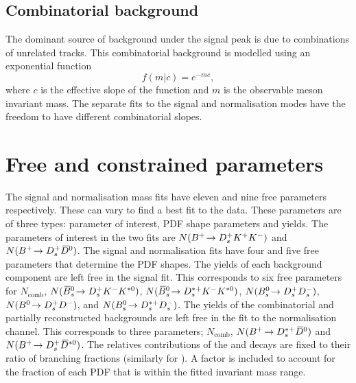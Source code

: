 \subsection{Combinatorial  background}
\label{sec:B2DsKK_combcomps}

The dominant source of background under the signal peak is due to combinations of unrelated tracks. This combinatorial background is modelled using an exponential function 
\begin{equation}
f(m|c) = e^{-mc},
\end{equation}
where $c$ is the effective slope of the function and $m$ is the observable \Bp meson invariant mass. The separate fits to the signal and normalisation modes have the freedom to have different combinatorial slopes.




\section{Free and constrained parameters}


The signal  and normalisation mass fits have eleven and nine free parameters respectively. These can vary to find a best fit to the data. These parameters are of three types: parameter of interest, PDF shape parameters and yields.
The parameters of interest in the two fits are $N({{{B}^+}}\!\rightarrow {\ensuremath{{D}^+_{s}}}{\ensuremath{{K}^+}}{\ensuremath{{K}^-}})$ and $N({{{B}^+}}\!\rightarrow {\ensuremath{{D}^+_{s}}}{\ensuremath{{\kern 0.2em\overline{\kern -0.2em D}{}}{}^0}})$.
The signal and normalisation fits have four and five free parameters that determine the PDF shapes. 
The yields of each background component are left free in the signal fit. This corresponds to six free parameters for $N_{\text{comb}}$, $N({{\kern 0.18em\overline{\kern -0.18em B}{}}{}^0_{s}}\!\rightarrow {\ensuremath{{D}^+_{s}}}{\ensuremath{{K}^-}}{\ensuremath{{K}^{*0}}})$, $N({{\kern 0.18em\overline{\kern -0.18em B}{}}{}^0_{s}}\!\rightarrow {\ensuremath{{D}^{*+}_{s}}}{\ensuremath{{K}^-}}{\ensuremath{{K}^{*0}}})$, $N({{B}^0_{s}}\!\rightarrow {\ensuremath{{D}^+_{s}}}{\ensuremath{{D}^-_{s}}})$, $N({{B}^0}\!\rightarrow {\ensuremath{{D}^+_{s}}}{\ensuremath{{D}^-}})$, and $N({{B}^0_{s}}\!\rightarrow {\ensuremath{{D}^{*+}_{s}}}{\ensuremath{{D}^-_{s}}})$. The yields of the combinatorial and partially reconstructed backgrounds are left free in the fit to the normalisation channel. This corresponds to three parameters; $N_{\text{comb}}$, $N({{{B}^+}}\!\rightarrow {\ensuremath{{D}^{*+}_{s}}}{\ensuremath{{\kern 0.2em\overline{\kern -0.2em D}{}}{}^0}})$ and $N({{{B}^+}}\!\rightarrow {\ensuremath{{D}^+_{s}}}{\ensuremath{{\kern 0.2em\overline{\kern -0.2em D}{}}{}^{*0}}})$. The relatives contributions of the \decay{\Dssp}{\Dsp\piz} and \decay{\Dssp}{\Dsp\Pgamma} decays are fixed to their ratio of branching fractions (similarly for \Dstarzb). A factor is included to account for the fraction of each PDF that is within the fitted \Bp invariant mass range.



